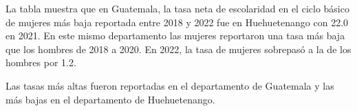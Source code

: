 La tabla muestra que en Guatemala, la tasa neta de escolaridad en el ciclo básico de mujeres más baja reportada entre 2018 y 2022 fue en Huehuetenango con 22.0 en 2021. En este mismo departamento las mujeres reportaron una tasa más baja que los hombres de 2018 a 2020. En 2022, la tasa de mujeres sobrepasó a la de los hombres por 1.2.

Las tasas más altas fueron reportadas en el departamento de Guatemala y las más bajas en el departamento de Huehuetenango.